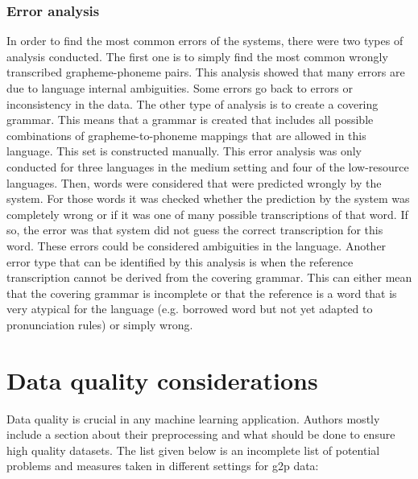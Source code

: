   
\subsubsection*{Error analysis}
In order to find the most common errors of the systems, there were two types of analysis conducted. The first one is to simply find the most common wrongly transcribed grapheme-phoneme pairs. This analysis showed that many errors are due to language internal ambiguities. Some errors go back to errors or inconsistency in the data. 
The other type of analysis is to create a covering grammar. This means that a grammar is created that includes all possible combinations of grapheme-to-phoneme mappings that are allowed in this language. This set is constructed manually. This error analysis was only conducted for three languages in the medium setting and four of the low-resource languages. Then, words were considered that were predicted wrongly by the system. For those words it was checked whether the prediction by the system was completely wrong or if it was one of many possible transcriptions of that word. If so, the error was that system did not guess the correct transcription for this word. These errors could be considered ambiguities in the language. Another error type that can be identified by this analysis is when the reference transcription cannot be derived from the covering grammar. This can either mean that the covering grammar is incomplete or that the reference is a word that is very atypical for the language (e.g. borrowed word but not yet adapted to pronunciation rules) or simply wrong. 

\section{Data quality considerations}
\label{data_qual}
Data quality is crucial in any machine learning application. Authors mostly include a section about their preprocessing and what should be done to ensure high quality datasets. The list given below is an incomplete list of potential problems and measures taken in different settings for \ac{g2p} data:

